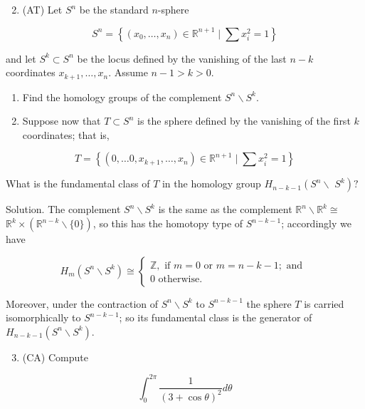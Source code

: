 \documentclass[10pt]{article}
\begin{document}
\begin{enumerate}
  \setcounter{enumi}{1}
  \item (AT) Let $S^{n}$ be the standard $n$-sphere
\end{enumerate}

$$
S^{n}=\left\{\left(x_{0}, \ldots, x_{n}\right) \in \mathbb{R}^{n+1} \mid \sum x_{i}^{2}=1\right\}
$$

and let $S^{k} \subset S^{n}$ be the locus defined by the vanishing of the last $n-k$ coordinates $x_{k+1}, \ldots, x_{n}$. Assume $n-1>k>0$.

\begin{enumerate}
  \item Find the homology groups of the complement $S^{n} \backslash S^{k}$.

  \item Suppose now that $T \subset S^{n}$ is the sphere defined by the vanishing of the first $k$ coordinates; that is,

\end{enumerate}

$$
T=\left\{\left(0, \ldots 0, x_{k+1}, \ldots, x_{n}\right) \in \mathbb{R}^{n+1} \mid \sum x_{i}^{2}=1\right\}
$$

What is the fundamental class of $T$ in the homology group $H_{n-k-1}\left(S^{n} \backslash\right.$ $\left.S^{k}\right) ?$

Solution. The complement $S^{n} \backslash S^{k}$ is the same as the complement $\mathbb{R}^{n} \backslash \mathbb{R}^{k} \cong$ $\mathbb{R}^{k} \times\left(\mathbb{R}^{n-k} \backslash\{0\}\right)$, so this has the homotopy type of $S^{n-k-1}$; accordingly we have

$$
H_{m}\left(S^{n} \backslash S^{k}\right) \cong\left\{\begin{array}{l}
\mathbb{Z}, \text { if } m=0 \text { or } m=n-k-1 ; \text { and } \\
0 \text { otherwise. }
\end{array}\right.
$$

Moreover, under the contraction of $S^{n} \backslash S^{k}$ to $S^{n-k-1}$ the sphere $T$ is carried isomorphically to $S^{n-k-1}$; so its fundamental class is the generator of $H_{n-k-1}\left(S^{n} \backslash S^{k}\right)$.

\begin{enumerate}
  \setcounter{enumi}{2}
  \item (CA) Compute
\end{enumerate}

$$
\int_{0}^{2 \pi} \frac{1}{(3+\cos \theta)^{2}} d \theta
$$
\end{document}
